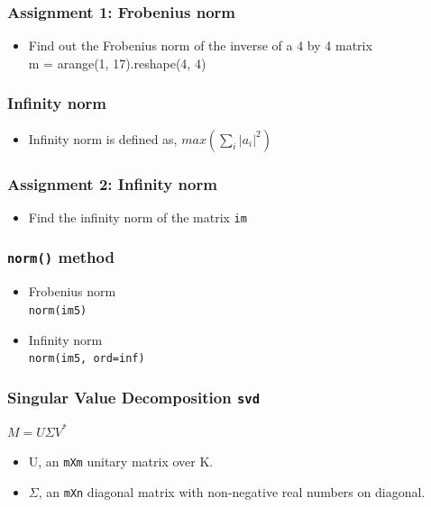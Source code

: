 \documentclass[17pt]{beamer}
\begin{document}
\begin{frame}[fragile]
\frametitle{Assignment 1: Frobenius norm}
\label{sec-6}
\begin{itemize}
\item Find out the Frobenius norm of the inverse of a 4 by 4 matrix
\\m = arange(1, 17).reshape(4, 4)
\end{itemize}
\end{frame}
\begin{frame}[fragile]
\frametitle{Infinity norm}
\label{sec-7}
\begin{itemize}
\item Infinity norm is defined as,
       $max(\sum_{i} |a_{i}|^2)$
\end{itemize}

\end{frame}
\begin{frame}[fragile]
\frametitle{Assignment 2: Infinity norm}
\begin{itemize}
\item Find the infinity norm of the matrix \texttt{im}
\end{itemize}

\end{frame}
\begin{frame}[fragile]
\frametitle{\texttt{norm()} method}
\label{sec-8}


\begin{itemize}
\item Frobenius norm\\
     \texttt{norm(im5)}\pause
\item Infinity norm\\
     \texttt{norm(im5, ord=inf)}
\end{itemize}
\end{frame}
\begin{frame}[fragile]
\frametitle{Singular Value Decomposition \texttt{svd}}
\label{sec-10.1}

   {\small  $M = U \Sigma V^*$}
\begin{itemize}
\item U, an \texttt{mXm} unitary matrix over K.
\item $\Sigma$, 
		 an \texttt{mXn} diagonal matrix with non-negative real numbers on diagonal.
\end{itemize}
\end{frame}
\end{document}
